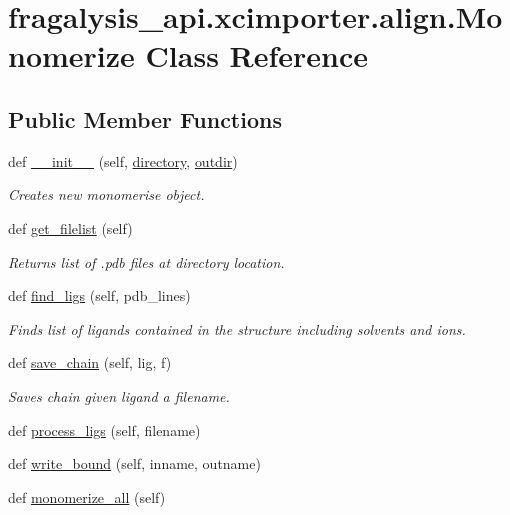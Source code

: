 \hypertarget{classfragalysis__api_1_1xcimporter_1_1align_1_1_monomerize}{}\section{fragalysis\+\_\+api.\+xcimporter.\+align.\+Monomerize Class Reference}
\label{classfragalysis__api_1_1xcimporter_1_1align_1_1_monomerize}
\subsection*{Public Member Functions}
\begin{DoxyCompactItemize}
\item 
def \hyperlink{classfragalysis__api_1_1xcimporter_1_1align_1_1_monomerize_ab3b407ab1e80bd20413390da2e92bc45}{\+\_\+\+\_\+init\+\_\+\+\_\+} (self, \hyperlink{classfragalysis__api_1_1xcimporter_1_1align_1_1_monomerize_a20636604f47438298d2420ce35297281}{directory}, \hyperlink{classfragalysis__api_1_1xcimporter_1_1align_1_1_monomerize_a7d47cce7a11f51abbfc8b246b42f5181}{outdir})
\begin{DoxyCompactList}\small\item\em Creates new monomerise object. \end{DoxyCompactList}\item 
def \hyperlink{classfragalysis__api_1_1xcimporter_1_1align_1_1_monomerize_ae400c1aa47fa3a5fe32a3ade3f601582}{get\+\_\+filelist} (self)
\begin{DoxyCompactList}\small\item\em Returns list of .pdb files at directory location. \end{DoxyCompactList}\item 
def \hyperlink{classfragalysis__api_1_1xcimporter_1_1align_1_1_monomerize_a95bebe718abd76f9546c67db4a1848b3}{find\+\_\+ligs} (self, pdb\+\_\+lines)
\begin{DoxyCompactList}\small\item\em Finds list of ligands contained in the structure including solvents and ions. \end{DoxyCompactList}\item 
def \hyperlink{classfragalysis__api_1_1xcimporter_1_1align_1_1_monomerize_a7dc86cd770a6c7532e96b0f45d91dc2b}{save\+\_\+chain} (self, lig, f)
\begin{DoxyCompactList}\small\item\em Saves chain given ligand a filename. \end{DoxyCompactList}\item 
def \hyperlink{classfragalysis__api_1_1xcimporter_1_1align_1_1_monomerize_a182c0cf1af3303f6c13d5160c6c0ff8e}{process\+\_\+ligs} (self, filename)
\item 
def \hyperlink{classfragalysis__api_1_1xcimporter_1_1align_1_1_monomerize_aa97d5e71f2d0309e12bc4beafa5151fc}{write\+\_\+bound} (self, inname, outname)
\item 
def \hyperlink{classfragalysis__api_1_1xcimporter_1_1align_1_1_monomerize_a2418993e78b9269ecc5d4222a142261c}{monomerize\+\_\+all} (self)
\end{DoxyCompactItemize}

